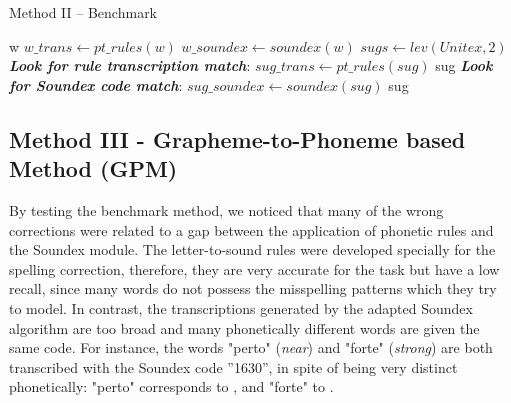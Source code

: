 \begin{algorithm}
\scriptsize
\caption{Method II -- Benchmark}\label{alg:pseudocode-method2}
\begin{algorithmic}[1]
\State \Return w
\Else
\State $w\_trans \gets pt\_rules(w)$ 
\State $w\_soundex \gets soundex(w)$ 
\State $sugs \gets lev(Unitex,2)$ 
\State \emph{\textbf{Look for rule transcription match}}:
\State $sug\_trans \gets pt\_rules(sug)$
\State \Return sug
\EndIf
\EndFor
\State \emph{\textbf{Look for Soundex code match}}:
\State $sug\_soundex \gets soundex(sug)$
\State \Return sug
\EndIf
\EndFor    
\State {} 
\EndIf
\EndProcedure
\end{algorithmic}
\end{algorithm}


\subsection{Method III - Grapheme-to-Phoneme based Method (GPM)}

By testing the benchmark method, we noticed that many of the wrong corrections were related to a gap between the application of phonetic rules and 
the Soundex module. The letter-to-sound rules were developed specially
for the spelling correction, therefore, they are very accurate for the task but have a low recall, since many words do not possess the misspelling patterns 
which they try to model. In contrast, the transcriptions generated by the adapted
Soundex algorithm are too broad and many phonetically different words are given the same code. For instance, the words "perto" (\emph{near}) and "forte" (\emph{strong}) are both
transcribed with the Soundex code ''1630'', in spite of being very distinct phonetically: 
"perto" corresponds to \textipa{['pEh.tU]}, and "forte" to .

